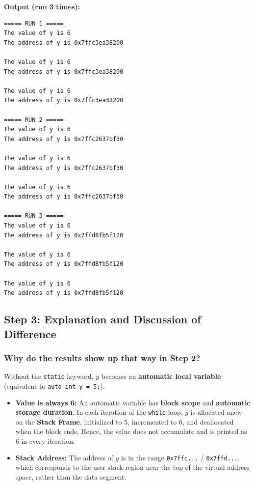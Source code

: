 \documentclass[12pt,a4paper]{article}
\begin{document}
\textbf{Output (run 3 times):}
\begin{lstlisting}[style=outstyle]
===== RUN 1 =====
The value of y is 6
The address of y is 0x7ffc3ea38200

The value of y is 6
The address of y is 0x7ffc3ea38200

The value of y is 6
The address of y is 0x7ffc3ea38200

===== RUN 2 =====
The value of y is 6
The address of y is 0x7ffc2637bf30

The value of y is 6
The address of y is 0x7ffc2637bf30

The value of y is 6
The address of y is 0x7ffc2637bf30

===== RUN 3 =====
The value of y is 6
The address of y is 0x7ffd8fb5f120

The value of y is 6
The address of y is 0x7ffd8fb5f120

The value of y is 6
The address of y is 0x7ffd8fb5f120
\end{lstlisting}

\subsection{Step 3: Explanation and Discussion of Difference}

\subsubsection*{Why do the results show up that way in Step 2?}
Without the \texttt{static} keyword, $y$ becomes an \textbf{automatic local variable} (equivalent to \texttt{auto int y = 5;}). 
\begin{itemize}
    \item \textbf{Value is always 6:} An automatic variable has \textbf{block scope} and \textbf{automatic storage duration}. In each iteration of the \texttt{while} loop, $y$ is allocated anew on the \textbf{Stack Frame}, initialized to $5$, incremented to $6$, and deallocated when the block ends. Hence, the value does not accumulate and is printed as $6$ in every iteration.
    \item \textbf{Stack Address:} The address of $y$ is in the range \texttt{0x7ffc...} / \texttt{0x7ffd...}, which corresponds to the user stack region near the top of the virtual address space, rather than the data segment.
\end{itemize}
\end{document}
